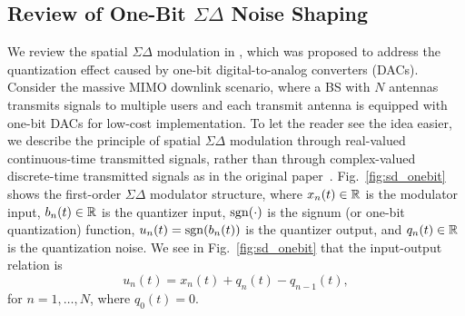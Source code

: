 \documentclass[10pt,twocolumn,twoside]{IEEEtran}
\begin{document}
\subsection{Review of One-Bit ${\Sigma \Delta}$ Noise Shaping}
\label{sec:review_SD}


We review the spatial $\Sigma\Delta$ modulation in \cite{shao2019one}, which was proposed to address the quantization effect caused by one-bit digital-to-analog converters (DACs).
Consider the massive MIMO downlink scenario, where a BS with $N$ antennas transmits signals to multiple users and each transmit antenna is equipped with one-bit DACs for low-cost implementation.
To let the reader see the idea easier, we describe the principle of spatial $\Sigma\Delta$ modulation through real-valued continuous-time transmitted signals, rather than through complex-valued discrete-time transmitted signals as in the original paper~\cite{shao2019one}.
Fig.~\ref{fig:sd_onebit} shows the first-order $\Sigma \Delta$ modulator structure,
where
$x_n(t) \in \mathbb{R}$ is the modulator input,
$b_n(t) \in \mathbb{R}$ is the quantizer input,
${\rm sgn}(\cdot)$ is the signum (or one-bit quantization) function,
$u_n(t) = {\rm sgn}(b_n(t))$ is the quantizer output,
and $q_n(t) \in \mathbb{R}$ is the quantization noise.
We see in Fig.~\ref{fig:sd_onebit} that the input-output relation is
\begin{equation}\label{eq:sd_unt}
u_n(t) = x_n(t) +  q_n(t) -  q_{n-1}(t),
\end{equation}
for $n=1,\dots,N$, where $q_0(t) = 0$.
\end{document}
